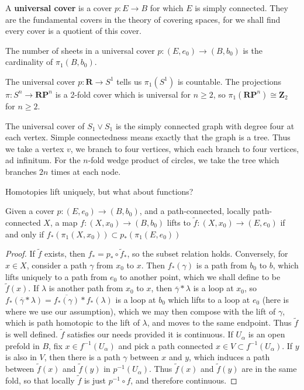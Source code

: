A {\bf universal cover} is a cover $p: E \to B$ for which $E$ is simply connected. They are the fundamental covers in the theory of covering spaces, for we shall find every cover is a quotient of this cover.

\begin{corollary}
    The number of sheets in a universal cover $p: (E,e_0) \to (B,b_0)$ is the cardinality of $\pi_1(B,b_0)$.
\end{corollary}

\begin{example}
    The universal cover $p: \mathbf{R} \to S^1$ tells us $\pi_1(S^1)$ is countable. The projections $\pi: S^n \to \mathbf{R} \mathbf{P}^n$ is a 2-fold cover which is universal for $n \geq 2$, so $\pi_1(\mathbf{R} \mathbf{P}^n) \cong \mathbf{Z}_2$ for $n \geq 2$.
\end{example}

\begin{example}
    The universal cover of $S_1 \vee S_1$ is the simply connected graph with degree four at each vertex. Simple connectedness means exactly that the graph is a tree. Thus we take a vertex $v$, we branch to four vertices, which each branch to four vertices, ad infinitum. For the $n$-fold wedge product of circles, we take the tree which branches $2n$ times at each node.
\end{example}

Homotopies lift uniquely, but what about functions?

\begin{theorem}
    Given a cover $p:(E,e_0) \to (B,b_0)$, and a path-connected, locally path-connected $X$, a map $f: (X,x_0) \to (B,b_0)$ lifts to $\tilde{f}: (X,x_0) \to (E,e_0)$ if and only if $f_*(\pi_1(X,x_0)) \subset p_*(\pi_1(E,e_0))$
\end{theorem}
\begin{proof}
    If $\tilde{f}$ exists, then $f_* = p_* \circ \tilde{f}_*$, so the subset relation holds. Conversely, for $x \in X$, consider a path $\gamma$ from $x_0$ to $x$. Then $f_*(\gamma)$ is a path from $b_0$ to $b$, which lifts uniquely to a path from $e_0$ to another point, which we shall define to be $\tilde{f}(x)$. If $\lambda$ is another path from $x_0$ to $x$, then $\overline{\gamma} * \lambda$ is a loop at $x_0$, so $f_*(\overline{\gamma} * \lambda) = \overline{f_*(\gamma)} * f_*(\lambda)$ is a loop at $b_0$ which lifts to a loop at $e_0$ (here is where we use our assumption), which we may then compose with the lift of $\gamma$, which is path homotopic to the lift of $\lambda$, and moves to the same endpoint. Thus $\tilde{f}$ is well defined. $\tilde{f}$ satisfies our needs provided it is continuous. If $U_\alpha$ is an open prefold in $B$, fix $x \in f^{-1}(U_\alpha)$ and pick a path connected $x \in V \subset f^{-1}(U_\alpha)$. If $y$ is also in $V$, then there is a path $\gamma$ between $x$ and $y$, which induces a path between $\tilde{f}(x)$ and $\tilde{f}(y)$ in $p^{-1}(U_\alpha)$. Thus $\tilde{f}(x)$ and $\tilde{f}(y)$ are in the same fold, so that locally $\tilde{f}$ is just $p^{-1} \circ f$, and therefore continuous.
\end{proof}

